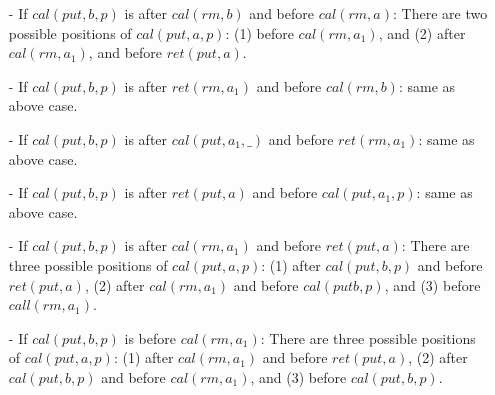 \documentclass{llncs}
\begin{document}
\begin{itemize}
\setlength{\itemsep}{0.5pt}
\item[-] If $\textit{cal}(\textit{put},b,p)$ is after $\textit{cal}(\textit{rm},b)$ and before $\textit{cal}(\textit{rm},a)$: There are two possible positions of $\textit{cal}(\textit{put},a,p)$: (1) before $\textit{cal}(\textit{rm},a_1)$, and (2) after $\textit{cal}(\textit{rm},a_1)$, and before $\textit{ret}(\textit{put},a)$.

\item[-] If $\textit{cal}(\textit{put},b,p)$ is after $\textit{ret}(\textit{rm},a_1)$ and before $\textit{cal}(\textit{rm},b)$: same as above case.

\item[-] If $\textit{cal}(\textit{put},b,p)$ is after $\textit{cal}(\textit{put},a_1,\_)$ and before $\textit{ret}(\textit{rm},a_1)$: same as above case.

\item[-] If $\textit{cal}(\textit{put},b,p)$ is after $\textit{ret}(\textit{put},a)$ and before $\textit{cal}(\textit{put},a_1,p)$: same as above case.

\item[-] If $\textit{cal}(\textit{put},b,p)$ is after $\textit{cal}(\textit{rm},a_1)$ and before $\textit{ret}(\textit{put},a)$: There are three possible positions of $\textit{cal}(\textit{put},a,p)$: (1) after $\textit{cal}(\textit{put},b,p)$ and before $\textit{ret}(\textit{put},a)$, (2) after $\textit{cal}(\textit{rm},a_1)$ and before $\textit{cal}(\textit{put}b,p)$, and (3) before $\textit{call}(\textit{rm},a_1)$.

\item[-] If $\textit{cal}(\textit{put},b,p)$ is before $\textit{cal}(\textit{rm},a_1)$: There are three possible positions of $\textit{cal}(\textit{put},a,p)$: (1) after $\textit{cal}(\textit{rm},a_1)$ and before $\textit{ret}(\textit{put},a)$, (2) after $\textit{cal}(\textit{put},b,p)$ and before $\textit{cal}(\textit{rm},a_1)$, and (3) before $\textit{cal}(\textit{put},b,p)$.
\end{itemize}
\end{document}
